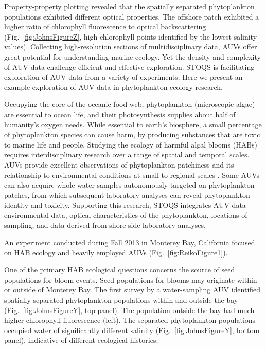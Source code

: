 \documentclass[conference]{IEEEtran}
\begin{document}
Property-property plotting revealed that the spatially separated phytoplankton populations exhibited different optical properties.  The offshore patch exhibited a higher ratio of chlorophyll fluorescence to optical backscattering (Fig.~\ref{fig:JohnsFigureZ}, high-chlorophyll points identified by the lowest salinity values).
Collecting high-resolution sections of multidisciplinary data, AUVs offer great potential for understanding marine ecology.  Yet the density and complexity of AUV data challenge efficient and effective exploration.  STOQS is facilitating exploration of AUV data from a variety of experiments.  Here we present an example exploration of AUV data in phytoplankton ecology research.

Occupying the core of the oceanic food web, phytoplankton (microscopic algae) are essential to ocean life, and their photosynthesis supplies about half of humanity’s oxygen needs.  While essential to earth’s biosphere, a small percentage of phytoplankton species can cause harm, by producing substances that are toxic to marine life and people.  Studying the ecology of harmful algal blooms (HABs) requires interdisciplinary research over a range of spatial and temporal scales. AUVs provide excellent observations of phytoplankton patchiness and its relationship to environmental conditions at small to regional scales \cite{Scholin2000}.  Some AUVs can also acquire whole water samples autonomously targeted on phytoplankton patches, from which subsequent laboratory analyses can reveal phytoplankton identity and toxicity.  Supporting this research, STOQS integrates AUV data environmental data, optical characteristics of the phytoplankton, locations of sampling, and data derived from shore-side laboratory analyses.

An experiment conducted during Fall 2013 in Monterey Bay, California focused on HAB ecology and heavily employed AUVs (Fig.~\ref{fig:ReikoFigure1}).  

One of the primary HAB ecological questions concerns the source of seed populations for bloom events.  Seed populations for blooms may originate within or outside of Monterey Bay.  The first survey by a water-sampling AUV identified spatially separated phytoplankton populations within and outside the bay (Fig.~\ref{fig:JohnsFigureY}, top panel).  The population outside the bay had much higher chlorophyll fluorescence (left).  The separated phytoplankton populations occupied water of significantly different salinity (Fig.~\ref{fig:JohnsFigureY}, bottom panel), indicative of different ecological histories.
\end{document}

